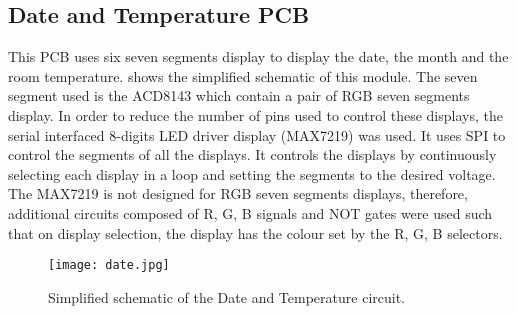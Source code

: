 \subsection{Date and Temperature PCB}
This PCB uses six seven segments display to display the date, the month and the room temperature.  shows the simplified schematic of this module. The seven segment used is the ACD8143 which contain a pair of RGB seven segments display. In order to reduce the number of pins used to control these displays, the serial interfaced 8-digits LED driver display (MAX7219) was used. It uses SPI to control the segments of all the displays. It controls the displays by continuously selecting each display in a loop and setting the segments to the desired voltage. The MAX7219 is not designed for RGB seven segments displays, therefore, additional circuits composed of R, G, B signals and NOT gates were used such that on display selection, the display has the colour set by the R, G, B selectors.   
\begin{figure}[ht]
\centering
\texttt{[image: date.jpg]}
\caption{Simplified schematic of the Date and Temperature circuit.}
\label{fig:date}
\end{figure}